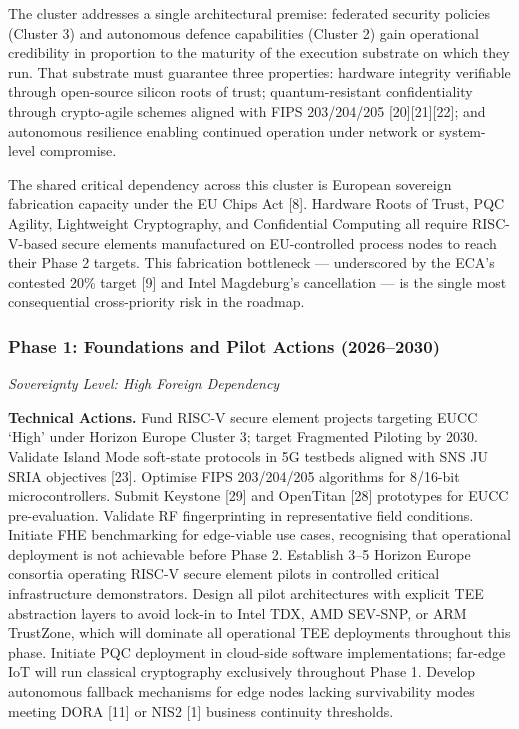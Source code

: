 \documentclass{ieeeaccess}
\begin{document}
The cluster addresses a single architectural premise: federated security
policies (Cluster 3) and autonomous defence capabilities (Cluster 2)
gain operational credibility in proportion to the maturity of the
execution substrate on which they run. That substrate must guarantee
three properties: hardware integrity verifiable through open-source
silicon roots of trust; quantum-resistant confidentiality through
crypto-agile schemes aligned with FIPS 203/204/205
{[}20{]}{[}21{]}{[}22{]}; and autonomous resilience enabling continued
operation under network or system-level compromise.

The shared critical dependency across this cluster is European sovereign
fabrication capacity under the EU Chips Act {[}8{]}. Hardware Roots of
Trust, PQC Agility, Lightweight Cryptography, and Confidential Computing
all require RISC-V-based secure elements manufactured on EU-controlled
process nodes to reach their Phase 2 targets. This fabrication
bottleneck --- underscored by the ECA's contested 20\% target {[}9{]}
and Intel Magdeburg's cancellation --- is the single most consequential
cross-priority risk in the roadmap.

\subsubsection{Phase 1: Foundations and Pilot Actions
(2026--2030)}\label{phase-1-foundations-and-pilot-actions-20262030}

\emph{Sovereignty Level: High Foreign Dependency}

\textbf{Technical Actions.} Fund RISC-V secure element projects
targeting EUCC `High' under Horizon Europe Cluster 3; target Fragmented
Piloting by 2030. Validate Island Mode soft-state protocols in 5G
testbeds aligned with SNS JU SRIA objectives {[}23{]}. Optimise FIPS
203/204/205 algorithms for 8/16-bit microcontrollers. Submit Keystone
{[}29{]} and OpenTitan {[}28{]} prototypes for EUCC pre-evaluation.
Validate RF fingerprinting in representative field conditions. Initiate
FHE benchmarking for edge-viable use cases, recognising that operational
deployment is not achievable before Phase 2. Establish 3--5 Horizon
Europe consortia operating RISC-V secure element pilots in controlled
critical infrastructure demonstrators. Design all pilot architectures
with explicit TEE abstraction layers to avoid lock-in to Intel TDX, AMD
SEV-SNP, or ARM TrustZone, which will dominate all operational TEE
deployments throughout this phase. Initiate PQC deployment in cloud-side
software implementations; far-edge IoT will run classical cryptography
exclusively throughout Phase 1. Develop autonomous fallback mechanisms
for edge nodes lacking survivability modes meeting DORA {[}11{]} or NIS2
{[}1{]} business continuity thresholds.
\end{document}
